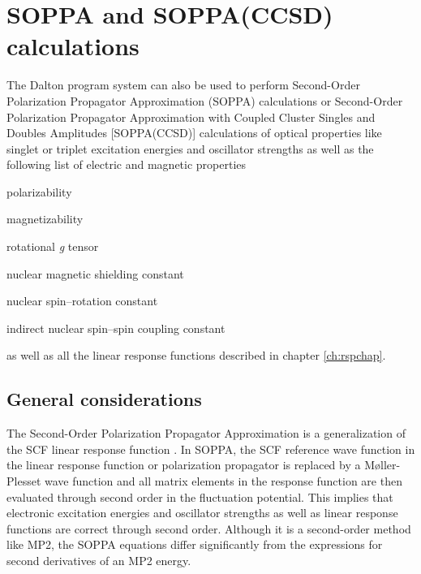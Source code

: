 \chapter{SOPPA and SOPPA(CCSD) calculations}\label{ch:soppa}

The Dalton program system can also be used to perform Second-Order
Polarization Propagator Approximation (SOPPA) 
 calculations
\cite{esnpjjodjcp73,mjpekdtehjajjojcp,spascpl260,tejospastcan100} or
Second-Order Polarization Propagator Approximation with Coupled Cluster
Singles and Doubles Amplitudes [SOPPA(CCSD)] 
calculations of optical properties like singlet or triplet excitation
energies and oscillator
strengths as well as the 
following list of electric and magnetic properties
\begin{center}
\begin{list}{}{}
\item polarizability
\item magnetizability
\item rotational {\em g} tensor
\item nuclear magnetic shielding constant
\item nuclear spin--rotation constant
\item indirect nuclear spin--spin coupling constant
\end{list}
\end{center}
as well as all the linear response functions described in chapter
\ref{ch:rspchap}.


\section{General considerations}\label{sec:soppageneral}

The Second-Order Polarization Propagator Approximation is a generalization of
the SCF linear response function
\cite{esnpjjodjcp73,jopjdycpr2,mjpekdtehjajjojcp}. In SOPPA, the SCF reference
wave function in the linear response function or polarization propagator is
replaced by a M{\o}ller-Plesset wave function and all matrix elements in the
response function are then evaluated through second order in the fluctuation
potential. This implies that electronic excitation energies and oscillator
strengths as well as linear response functions are correct through second
order. Although it is a second-order method like MP2, the SOPPA equations
differ significantly from the expressions for second derivatives of an MP2
energy. 

